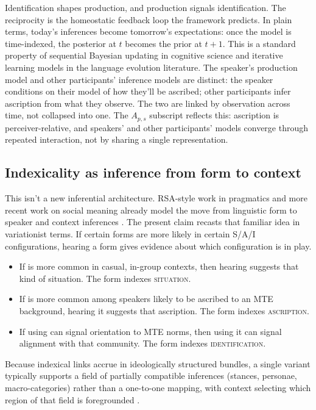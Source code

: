 \documentclass[11pt,letterpaper]{article}
\begin{document}
Identification shapes production, and production signals identification. The reciprocity is the homeostatic feedback loop the framework predicts. In plain terms, today's inferences become tomorrow's expectations: once the model is time-indexed, the posterior at $t$ becomes the prior at $t{+}1$. This is a standard property of sequential Bayesian updating in cognitive science and iterative learning models in the language evolution literature. The speaker's production model and other participants' inference models are distinct: the speaker conditions on their model of how they'll be ascribed; other participants infer ascription from what they observe. The two are linked by observation across time, not collapsed into one. The $A_{p,s}$ subscript reflects this: ascription is perceiver-relative, and speakers' and other participants' models converge through repeated interaction, not by sharing a single representation.

\subsection{Indexicality as inference from form to context}

This isn't a new inferential architecture. RSA-style work in pragmatics and more recent work on social meaning already model the move from linguistic form to speaker and context inferences \citep{FrankGoodman2012,Beltrama2020}. The present claim recasts that familiar idea in variationist terms. If certain forms are more likely in certain S/A/I configurations, hearing a form gives evidence about which configuration is in play.

\begin{itemize}
    \item If  is more common in casual, in-group contexts, then hearing  suggests that kind of situation. The form indexes \textsc{situation}.
    \item If  is more common among speakers likely to be ascribed to an MTE background, hearing it suggests that ascription. The form indexes \textsc{ascription}.
    \item If using  can signal orientation to MTE norms, then using it can signal alignment with that community. The form indexes \textsc{identification}.
\end{itemize}

Because indexical links accrue in ideologically structured bundles, a single variant typically supports a field of partially compatible inferences (stances, personae, macro-categories) rather than a one-to-one mapping, with context selecting which region of that field is foregrounded \citep[55--57]{drummond_schleef2016_identity}.
\end{document}
